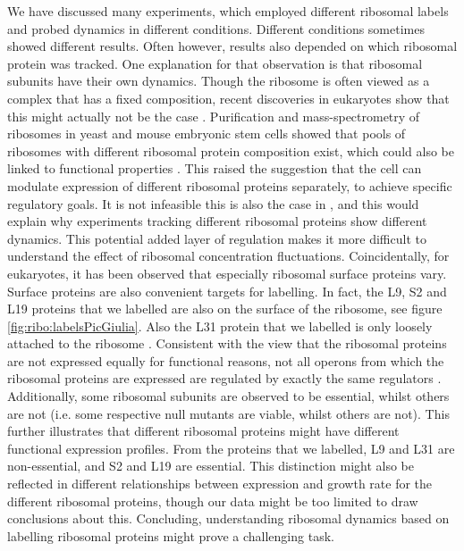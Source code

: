 We have discussed many experiments, which employed different ribosomal labels and probed dynamics in different conditions.
%
Different conditions sometimes showed different results.
%
Often however, results also depended on which ribosomal protein was tracked.
%
One explanation for that observation is that ribosomal subunits have their own dynamics.
%
Though the ribosome is often viewed as a complex that has a fixed composition, 
recent discoveries in eukaryotes show that this might actually not be the case \cite{Preiss2016, Slavov2015}.
%
Purification and mass-spectrometry of ribosomes in yeast and mouse embryonic stem cells showed that 
pools of ribosomes with different ribosomal protein composition exist, which could also be linked to functional properties \cite{Slavov2015}.
%
This raised the suggestion that the cell can modulate expression of different ribosomal proteins separately, 
to achieve specific regulatory goals.
%
It is not infeasible this is also the case in \ecoli, and this would explain why experiments tracking different ribosomal proteins show different dynamics.
%
This potential added layer of regulation makes it more difficult to understand the effect of ribosomal concentration fluctuations.
Coincidentally, for eukaryotes, it has been observed that especially ribosomal surface proteins vary.
Surface proteins are also convenient targets for labelling.
In fact, the L9, S2 and L19 proteins that we  labelled are also on the surface of the ribosome, see figure \ref{fig:ribo:labelsPicGiulia}.
Also the L31 protein that we labelled is only loosely attached to the ribosome \cite{Walker2016t}.
%
Consistent with the view that the ribosomal proteins are not expressed equally for functional reasons, 
not all operons from which the ribosomal proteins are expressed are regulated by exactly the same regulators \cite{Keseler2017}.
%
Additionally, some ribosomal subunits are observed to be essential, whilst others are not (i.e. some respective null mutants are viable, whilst others are not).
This further illustrates that different ribosomal proteins might have different functional expression profiles.
%
From the proteins that we labelled, L9 and L31 are non-essential, and S2 and L19 are essential.
%
This distinction might also be reflected in different relationships between expression and growth rate for the different ribosomal proteins, 
though our data might be too limited to draw conclusions about this.
%
%
Concluding, understanding ribosomal dynamics based on labelling ribosomal proteins might prove a challenging task.


